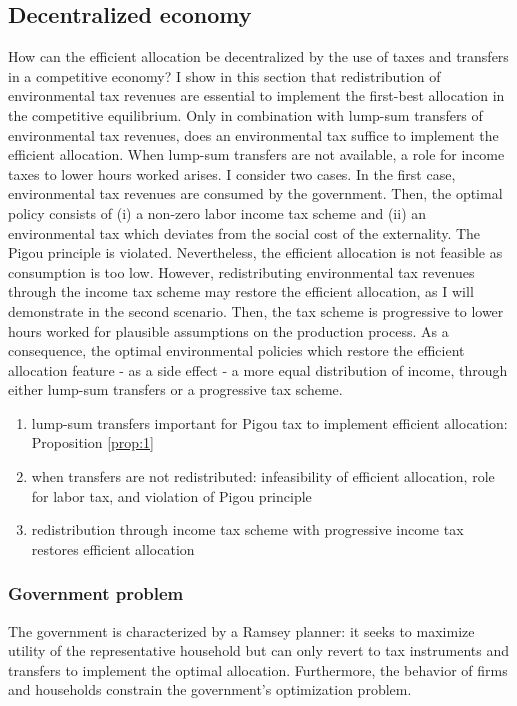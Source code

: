 \subsection{Decentralized economy}

How can the efficient allocation be decentralized by the use of taxes and transfers in a competitive economy? %
I show in this section that redistribution of environmental tax revenues are essential to implement the first-best allocation in the competitive equilibrium. Only in combination with lump-sum transfers of  environmental tax revenues, does an environmental tax suffice to implement the efficient allocation. 
When lump-sum transfers are not available, a role for income taxes to lower hours worked arises. I consider two cases.
In the first case, environmental tax revenues are consumed by the government. Then, the optimal policy consists of (i) a non-zero labor income tax scheme and (ii) an environmental tax which deviates from the social cost of the externality. The Pigou principle is violated. Nevertheless, the efficient allocation is not feasible as consumption is too low.
However, redistributing environmental tax revenues through the income tax scheme may restore the efficient allocation, as I will demonstrate in the second scenario. Then, the tax scheme is progressive to lower hours worked for plausible assumptions on the production process.
As a consequence, the optimal environmental policies which restore the efficient allocation feature - as a side effect - a more equal distribution of income, through either lump-sum transfers or a progressive tax scheme.%

\begin{enumerate}
\item lump-sum transfers important for Pigou tax to implement efficient allocation: Proposition \ref{prop:1}
\item when transfers are not redistributed: infeasibility of efficient allocation,  role for labor tax, and violation of Pigou principle
\item redistribution through income tax scheme with progressive income tax restores efficient allocation
\end{enumerate}

\subsubsection{Government problem}\label{subsec:Rams}
The government is characterized by a Ramsey planner: it seeks to maximize utility of the representative household but can only revert to tax instruments and transfers to implement the optimal allocation. Furthermore, the behavior of firms and households constrain the government's optimization problem. 


